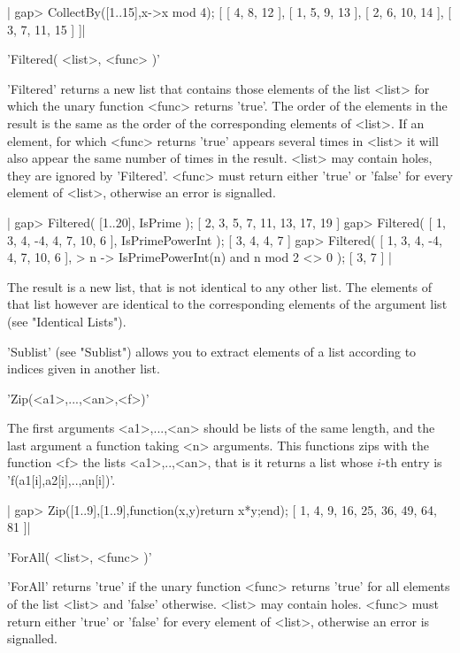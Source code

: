 |  gap> CollectBy([1..15],x->x mod 4);
   [ [ 4, 8, 12 ], [ 1, 5, 9, 13 ], [ 2, 6, 10, 14 ], [ 3, 7, 11, 15 ] ]|


'Filtered( <list>, <func> )'

'Filtered' returns  a new list that  contains those elements of  the list
<list> for which the unary function <func> returns  'true'.  The order of
the elements in the result is the same  as the order of the corresponding
elements  of <list>.  If  an  element, for   which <func> returns  'true'
appears several times  in <list> it will  also appear the same  number of
times  in the result.   <list>  may contain  holes,  they are  ignored by
'Filtered'.  <func>  must  return  either  'true' or 'false'    for every
element of <list>, otherwise an error is signalled.

|    gap> Filtered( [1..20], IsPrime );
    [ 2, 3, 5, 7, 11, 13, 17, 19 ]
    gap> Filtered( [ 1, 3, 4, -4, 4, 7, 10, 6 ], IsPrimePowerInt );
    [ 3, 4, 4, 7 ]
    gap> Filtered( [ 1, 3, 4, -4, 4, 7, 10, 6 ],
    >              n -> IsPrimePowerInt(n) and n mod 2 <> 0 );
    [ 3, 7 ] |

The result is a new list, that is  not identical to any  other list.  The
elements of that list however are identical to the corresponding elements
of the argument list (see "Identical Lists").

'Sublist' (see "Sublist")  allows  you  to extract  elements of   a  list
according to indices given in another list.

%

'Zip(<a1>,...,<an>,<f>)'

The  first arguments <a1>,...,<an> should be  lists of the same length, and
the last argument a function taking <n> arguments. This functions zips with
the  function <f> the lists  <a1>,..,<an>, that is it  returns a list whose
$i$-th entry is 'f(a1[i],a2[i],..,an[i])'.

|   gap> Zip([1..9],[1..9],function(x,y)return x*y;end);
   [ 1, 4, 9, 16, 25, 36, 49, 64, 81 ]|


'ForAll( <list>, <func> )'

'ForAll' returns  'true' if the  unary function <func> returns 'true' for
all  elements of  the list   <list> and 'false'  otherwise.   <list>  may
contain  holes.   <func> must return either  'true' or 'false' for  every
element of <list>, otherwise an error is signalled.

